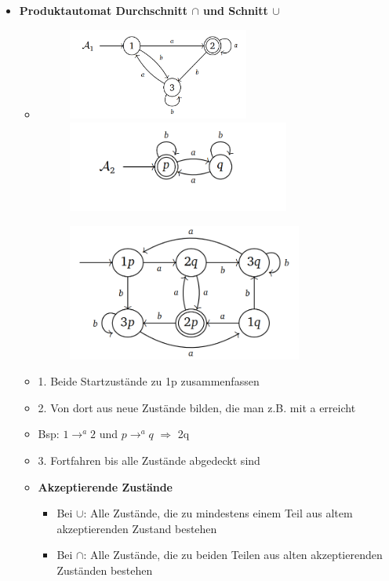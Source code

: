 \documentclass[11pt,a4paper]{article}
\begin{document}
\begin{itemize}

\item {\large \textbf{Produktautomat Durchschnitt $\cap$ und Schnitt $\cup$}}
	\begin{itemize}
	
	\item[]
		\begin{minipage}{0.4\textwidth}
				\begin{figure}[H]
				\includegraphics[height=3cm]{durchschnitt1}
				\includegraphics[height=3cm]{durchschnitt3}
				\end{figure}
			\end{minipage}
			\begin{minipage}[t]{0.4\textwidth}
				\vspace{-3cm}
				\begin{figure}[H]
				\includegraphics[height=4.5cm]{durchschnitt2}
				\end{figure}
			\end{minipage}
	\item 1. Beide Startzustände zu 1p zusammenfassen
	\item 2. Von dort aus neue Zustände bilden, die man z.B. mit a erreicht
	\item Bsp: $1 \rightarrow^a 2$ und $p \rightarrow^a q$ $\Rightarrow$ 2q
	\item 3. Fortfahren bis alle Zustände abgedeckt sind
	\item \textbf{Akzeptierende Zustände}
		\begin{itemize}
		\item Bei $\cup$: Alle Zustände, die zu mindestens einem Teil aus altem akzeptierenden Zustand bestehen
		\item Bei $\cap$: Alle Zustände, die zu beiden Teilen aus alten akzeptierenden Zuständen bestehen
		\end{itemize}
	

\end{itemize}
\end{itemize}
\end{document}
